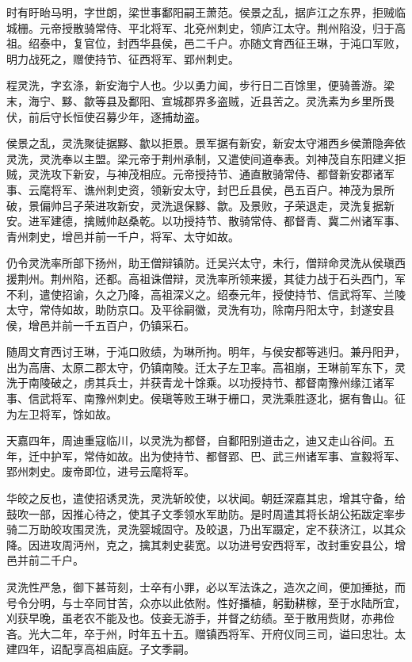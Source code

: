 \documentclass[]{article}
\begin{document}
时有盱眙马明，字世朗，梁世事鄱阳嗣王萧范。侯景之乱，据庐江之东界，拒贼临城栅。元帝授散骑常侍、平北将军、北兗州刺史，领庐江太守。荆州陷没，归于高祖。绍泰中，复官位，封西华县侯，邑二千户。亦随文育西征王琳，于沌口军败，明力战死之，赠使持节、征西将军、郢州刺史。

程灵洗，字玄涤，新安海宁人也。少以勇力闻，步行日二百馀里，便骑善游。梁末，海宁、黟、歙等县及鄱阳、宣城郡界多盗贼，近县苦之。灵洗素为乡里所畏伏，前后守长恒使召募少年，逐捕劫盗。

侯景之乱，灵洗聚徒据黟、歙以拒景。景军据有新安，新安太守湘西乡侯萧隐奔依灵洗，灵洗奉以主盟。梁元帝于荆州承制，又遣使间道奉表。刘神茂自东阳建义拒贼，灵洗攻下新安，与神茂相应。元帝授持节、通直散骑常侍、都督新安郡诸军事、云麾将军、谯州刺史资，领新安太守，封巴丘县侯，邑五百户。神茂为景所破，景偏帅吕子荣进攻新安，灵洗退保黟、歙。及景败，子荣退走，灵洗复据新安。进军建德，擒贼帅赵桑乾。以功授持节、散骑常侍、都督青、冀二州诸军事、青州刺史，增邑并前一千户，将军、太守如故。

仍令灵洗率所部下扬州，助王僧辩镇防。迁吴兴太守，未行，僧辩命灵洗从侯瑱西援荆州。荆州陷，还都。高祖诛僧辩，灵洗率所领来援，其徒力战于石头西门，军不利，遣使招谕，久之乃降，高祖深义之。绍泰元年，授使持节、信武将军、兰陵太守，常侍如故，助防京口。及平徐嗣徽，灵洗有功，除南丹阳太守，封遂安县侯，增邑并前一千五百户，仍镇采石。

随周文育西讨王琳，于沌口败绩，为琳所拘。明年，与侯安都等逃归。兼丹阳尹，出为高唐、太原二郡太守，仍镇南陵。迁太子左卫率。高祖崩，王琳前军东下，灵洗于南陵破之，虏其兵士，并获青龙十馀乘。以功授持节、都督南豫州缘江诸军事、信武将军、南豫州刺史。侯瑱等败王琳于栅口，灵洗乘胜逐北，据有鲁山。征为左卫将军，馀如故。

天嘉四年，周迪重寇临川，以灵洗为都督，自鄱阳别道击之，迪又走山谷间。五年，迁中护军，常侍如故。出为使持节、都督郢、巴、武三州诸军事、宣毅将军、郢州刺史。废帝即位，进号云麾将军。

华皎之反也，遣使招诱灵洗，灵洗斩皎使，以状闻。朝廷深嘉其忠，增其守备，给鼓吹一部，因推心待之，使其子文季领水军助防。是时周遣其将长胡公拓跋定率步骑二万助皎攻围灵洗，灵洗婴城固守。及皎退，乃出军蹑定，定不获济江，以其众降。因进攻周沔州，克之，擒其刺史裴宽。以功进号安西将军，改封重安县公，增邑并前二千户。

灵洗性严急，御下甚苛刻，士卒有小罪，必以军法诛之，造次之间，便加捶挞，而号令分明，与士卒同甘苦，众亦以此依附。性好播植，躬勤耕稼，至于水陆所宜，刈获早晚，虽老农不能及也。伎妾无游手，并督之纺绩。至于散用赀财，亦弗俭吝。光大二年，卒于州，时年五十五。赠镇西将军、开府仪同三司，谥曰忠壮。太建四年，诏配享高祖庙庭。子文季嗣。
\end{document}
